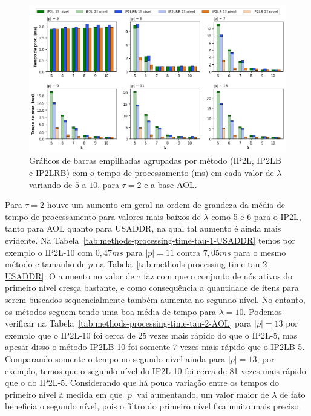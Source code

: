 \begin{figure} [h]
    \centering
    \includegraphics[width=1.0\textwidth]{figures/methods_processing_time_aol_2.png}
    \caption{Gráficos de barras empilhadas agrupadas por método (IP2L, IP2LB e IP2LRB) com o tempo de processamento (ms) em cada valor de $\lambda$ variando de $5$ a $10$, para $\tau=2$ e a base AOL.}
    \label{fig:methods_processing_time_aol_2}
\end{figure}

Para $\tau=2$ houve um aumento em geral na ordem de grandeza da média de tempo de processamento para valores mais baixos de $\lambda$ como 5 e 6 para o IP2L, tanto para AOL quanto para USADDR, na qual tal aumento é ainda mais evidente. Na Tabela~\ref{tab:methods-processing-time-tau-1-USADDR} temos por exemplo o IP2L-10 com $0,47ms$ para $|p|=11$ contra $7,05ms$ para o mesmo método e tamanho de $p$ na Tabela~\ref{tab:methods-processing-time-tau-2-USADDR}. O aumento no valor de $\tau$ faz com que o conjunto de nós ativos do primeiro nível cresça bastante, e como consequência a quantidade de itens para serem buscados sequencialmente também aumenta no segundo nível. No entanto, os métodos seguem tendo uma boa média de tempo para $\lambda=10$. Podemos verificar na Tabela~\ref{tab:methods-processing-time-tau-2-AOL} para $|p|=13$ por exemplo que o IP2L-10 foi cerca de 25 vezes mais rápido do que o IP2L-5, mas apesar disso o método IP2LB-10 foi somente 7 vezes mais rápido que o IP2LB-5. Comparando somente o tempo no segundo nível ainda para $|p|=13$, por exemplo, temos que o segundo nível do IP2L-10 foi cerca de 81 vezes mais rápido que o do IP2L-5. Considerando que há pouca variação entre os tempos do primeiro nível à medida em que $|p|$ vai aumentando, um valor maior de $\lambda$ de fato beneficia o segundo nível, pois o filtro do primeiro nível fica muito mais preciso.

